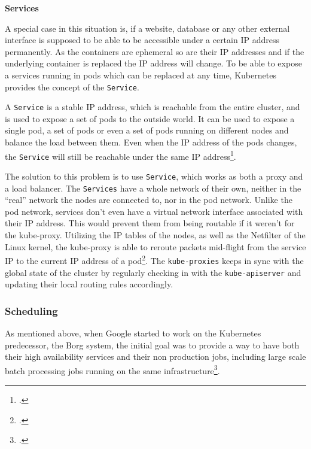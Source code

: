 \textbf{Services}

A special case in this situation is, if a website, database or any other external interface
is supposed to be able to be accessible under a certain \ac{IP} address permanently.
As the containers are ephemeral so are their \ac{IP} addresses and if the underlying container is replaced the \ac{IP} address will change.
To be able to expose a services running in pods which can be replaced at any time,  Kubernetes provides the concept of the \texttt{Service}.

A \texttt{Service} is a stable \ac{IP} address, which is reachable from the entire cluster, and is used to expose a set of pods to the outside world.
It can be used to expose a single pod, a set of pods or even a set of pods running on different nodes and balance the load between them.
Even when the \ac{IP} address of the pods changes, the \texttt{Service} will still be reachable under the same \ac{IP} address\footcite{velayudhanVisualGuideKubernetes}.

The solution to this problem is to use \texttt{Service}, which works as both a proxy and a load balancer.
The \texttt{Services} have a whole network of their own, neither in the “real” network the nodes are connected to, nor in the pod network.
Unlike the pod network, services don't even have a virtual network interface associated with their IP address.
This would prevent them from being routable if it weren't for the kube-proxy.
Utilizing the IP tables of the nodes, as well as the Netfilter of the Linux kernel,
the kube-proxy is able to reroute packets mid-flight from the service IP to the current IP address of a pod\footcite{betzUnderstandingKubernetesNetworking2022}.
The \texttt{kube-proxies} keeps in sync with the global state of the cluster by regularly checking in with the \texttt{kube-apiserver} and updating their local
routing rules accordingly.




\subsubsection{Scheduling}

As mentioned above, when Google started to work on the Kubernetes predecessor, the Borg system,
the initial goal was to provide a way to have both their high availability services and their non production jobs,
including large scale batch processing jobs running on the same infrastructure\footcite{abhishekvermaLargescaleClusterManagement2015}.

